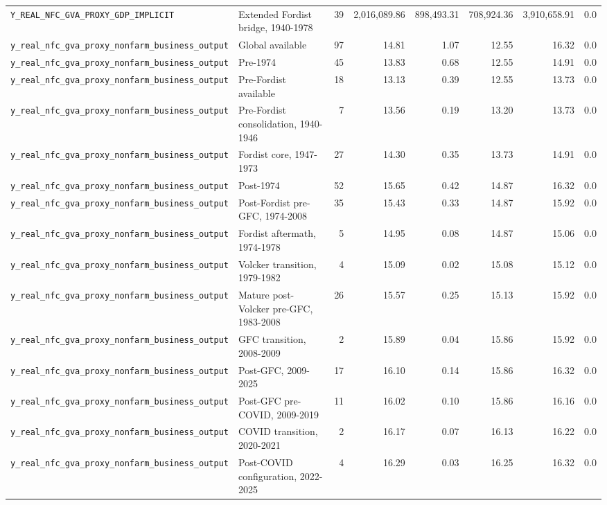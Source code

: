 \begin{landscape}
\begin{longtable}{p{4.4cm}p{3.8cm}rrrrrr}
\nolinkurl{Y_REAL_NFC_GVA_PROXY_GDP_IMPLICIT} & Extended Fordist bridge, 1940-1978 & 39 & 2,016,089.86 & 898,493.31 & 708,924.36 & 3,910,658.91 & 0.0
\\
\nolinkurl{y_real_nfc_gva_proxy_nonfarm_business_output} & Global available & 97 & 14.81 & 1.07 & 12.55 & 16.32 & 0.0
\\
\nolinkurl{y_real_nfc_gva_proxy_nonfarm_business_output} & Pre-1974 & 45 & 13.83 & 0.68 & 12.55 & 14.91 & 0.0
\\
\nolinkurl{y_real_nfc_gva_proxy_nonfarm_business_output} & Pre-Fordist available & 18 & 13.13 & 0.39 & 12.55 & 13.73 & 0.0
\\
\nolinkurl{y_real_nfc_gva_proxy_nonfarm_business_output} & Pre-Fordist consolidation, 1940-1946 & 7 & 13.56 & 0.19 & 13.20 & 13.73 & 0.0
\\
\nolinkurl{y_real_nfc_gva_proxy_nonfarm_business_output} & Fordist core, 1947-1973 & 27 & 14.30 & 0.35 & 13.73 & 14.91 & 0.0
\\
\nolinkurl{y_real_nfc_gva_proxy_nonfarm_business_output} & Post-1974 & 52 & 15.65 & 0.42 & 14.87 & 16.32 & 0.0
\\
\nolinkurl{y_real_nfc_gva_proxy_nonfarm_business_output} & Post-Fordist pre-GFC, 1974-2008 & 35 & 15.43 & 0.33 & 14.87 & 15.92 & 0.0
\\
\nolinkurl{y_real_nfc_gva_proxy_nonfarm_business_output} & Fordist aftermath, 1974-1978 & 5 & 14.95 & 0.08 & 14.87 & 15.06 & 0.0
\\
\nolinkurl{y_real_nfc_gva_proxy_nonfarm_business_output} & Volcker transition, 1979-1982 & 4 & 15.09 & 0.02 & 15.08 & 15.12 & 0.0
\\
\nolinkurl{y_real_nfc_gva_proxy_nonfarm_business_output} & Mature post-Volcker pre-GFC, 1983-2008 & 26 & 15.57 & 0.25 & 15.13 & 15.92 & 0.0
\\
\nolinkurl{y_real_nfc_gva_proxy_nonfarm_business_output} & GFC transition, 2008-2009 & 2 & 15.89 & 0.04 & 15.86 & 15.92 & 0.0
\\
\nolinkurl{y_real_nfc_gva_proxy_nonfarm_business_output} & Post-GFC, 2009-2025 & 17 & 16.10 & 0.14 & 15.86 & 16.32 & 0.0
\\
\nolinkurl{y_real_nfc_gva_proxy_nonfarm_business_output} & Post-GFC pre-COVID, 2009-2019 & 11 & 16.02 & 0.10 & 15.86 & 16.16 & 0.0
\\
\nolinkurl{y_real_nfc_gva_proxy_nonfarm_business_output} & COVID transition, 2020-2021 & 2 & 16.17 & 0.07 & 16.13 & 16.22 & 0.0
\\
\nolinkurl{y_real_nfc_gva_proxy_nonfarm_business_output} & Post-COVID configuration, 2022-2025 & 4 & 16.29 & 0.03 & 16.25 & 16.32 & 0.0

\end{longtable}
\end{landscape}
